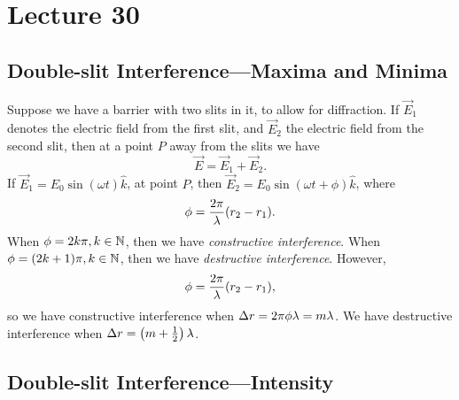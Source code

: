\documentclass[class=article, crop=false]{standalone}
\begin{document}
  \section{Lecture 30}
  \subsection{Double-slit Interference---Maxima and Minima}
  Suppose we have a barrier with two slits in it, to allow for diffraction. If $\vec{E}_1$ denotes the electric field from the first slit, and $\vec{E}_2$ the electric field from the second slit, then at a point $P$ away from the slits we have
  \[
    \vec{E} = \vec{E}_1 + \vec{E}_2.
  \]
  If $\vec{E}_1 = E_0\sin(\omega t)\hat{k}$, at point $P$, then $\vec{E}_2 = E_0\sin(\omega t + \phi)\hat{k}$, where
  \[
    \phi = \frac{2\pi}{\lambda}(r_2-r_1).
  \]
  When $\phi  = 2k\pi, k\in \mathbb{N}$, then we have \emph{constructive interference}. When $\phi = (2k + 1)\pi, k\in\mathbb{N}$, then we have \emph{destructive interference}. However,
  \[
    \phi = \frac{2\pi}{\lambda}(r_2-r_1),
  \]
  so we have constructive interference when $\Delta r = 2\pi\phi\lambda = m\lambda$. We have destructive interference when $\Delta r = \left( m + \frac{1}{2} \right)\lambda$.
  \subsection{Double-slit Interference---Intensity}
\end{document}
